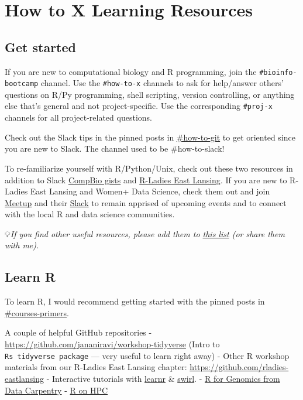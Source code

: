 \documentclass[
  letterpaper,
  DIV=11,
  numbers=noendperiod]{scrreprt}
\begin{document}
\hypertarget{how-to-x-learning-resources}{%
\chapter{How to X \textbar{} Learning
Resources}\label{how-to-x-learning-resources}}

\hypertarget{get-started}{%
\section{Get started}\label{get-started}}

If you are new to computational biology and R programming, join the
\texttt{\#bioinfo-bootcamp} channel. Use the \texttt{\#how-to-x}
channels to ask for help/answer others' questions on R/Py programming,
shell scripting, version controlling, or anything else that's general
and not project-specific. Use the corresponding \texttt{\#proj-x}
channels for all project-related questions.

Check out the Slack tips in the pinned posts in
\href{https://jravilab.slack.com/archives/CATMCKFT9}{\#how-to-git} to
get oriented since you are new to Slack. The channel used to be
\#how-to-slack!

To re-familiarize yourself with R/Python/Unix, check out these two
resources in addition to Slack \textbar{}
\href{https://github.com/jananiravi/compbio-gists}{CompBio gists} and
\href{https://github.com/rladies-eastlansing}{R-Ladies East Lansing}. If
you are new to R-Ladies East Lansing and Women+ Data Science, check them
out and join \href{https://meetup.com/rladies-eastlansing}{Meetup} and
their \href{https://rladies-eastlansing.slack.com/}{Slack} to remain
apprised of upcoming events and to connect with the local R and data
science communities.

💡\emph{If you find other useful resources, please add them to
\href{https://github.com/jananiravi/compbio-gists}{this list} (or share
them with me).}

\hypertarget{learn-r}{%
\section{Learn R}\label{learn-r}}

To learn R, I would recommend getting started with the pinned posts in
\href{https://jravilab.slack.com/archives/CARJ72W3U}{\#courses-primers}.

A couple of helpful GitHub repositories -
\url{https://github.com/jananiravi/workshop-tidyverse} (Intro to
\texttt{R\textquotesingle{}s\ tidyverse\ package} --- very useful to
learn right away) - Other R workshop materials from our R-Ladies East
Lansing chapter: \url{https://github.com/rladies-eastlansing} -
Interactive tutorials with
\href{https://rstudio.github.io/learnr/}{learnr} \&
\href{https://swirlstats.com/}{swirl}. -
\href{https://datacarpentry.org/R-genomics/index.html}{R for Genomics
from Data Carpentry} -
\href{https://github.com/JRaviLab/group/tree/master/resources-courses/r-on-hpc}{R
on HPC}
\end{document}
